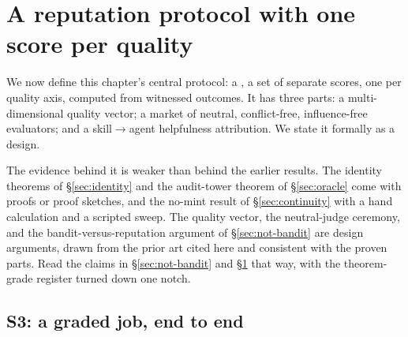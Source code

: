 \documentclass[11pt,a4paper]{article}
\theoremstyle{definition}
\newcounter{protocol}[section]
\begin{document}
\section{A reputation protocol with one score per quality}\label{sec:adr0049}

We now define this chapter's central protocol: a
, a set of separate scores, one per quality
axis, computed from witnessed outcomes. It has three parts: a
multi-dimensional quality vector; a market of neutral, conflict-free,
influence-free evaluators; and a skill$\to$agent helpfulness attribution. We
state it formally as a design.

\noindent The evidence behind it is weaker than behind the earlier results. The
identity theorems of \S\ref{sec:identity} and the audit-tower theorem of
\S\ref{sec:oracle} come with proofs or proof sketches, and the no-mint result of
\S\ref{sec:continuity} with a hand calculation and a scripted sweep. The quality
vector, the neutral-judge ceremony, and the bandit-versus-reputation argument
of \S\ref{sec:not-bandit} are design arguments, drawn from the prior art cited
here and consistent with the proven parts. Read the claims in
\S\ref{sec:not-bandit} and \S\ref{sec:adr0049} that way, with the
theorem-grade register turned down one notch.

\subsection{S3: a graded job, end to end}
\end{document}
